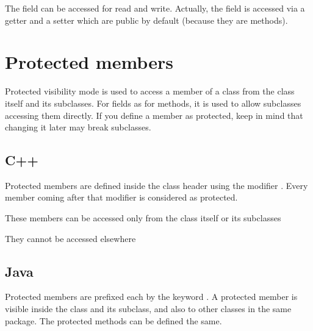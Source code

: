 \documentclass{KodeBook}
\begin{document}


The field can be accessed for read and write. 
Actually, the field is accessed via a getter and a setter which are public by default (because they are methods).




\section{Protected members}

Protected visibility mode is used to access a member of a class from the class itself and its subclasses. 
For fields as for methods, it is used to allow subclasses accessing them directly. 
If you define a member as protected, keep in mind that changing it later may break subclasses.

\subsection{C++}

Protected members are defined inside the class header using the modifier . 
Every member coming after that modifier is considered as protected.



These members can be accessed only from the class itself or its subclasses



They cannot be accessed elsewhere



\subsection{Java}

Protected members are prefixed each by the keyword . 
A protected member is visible inside the class and its subclass, and also to other classes in the same package. 
The protected methods can be defined the same.
\end{document}

